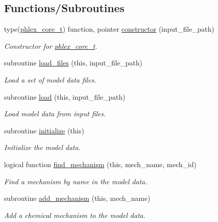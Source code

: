 \subsection*{Functions/\+Subroutines}
\begin{DoxyCompactItemize}
\item 
type(\mbox{\hyperlink{structpmc__phlex__core_1_1phlex__core__t}{phlex\+\_\+core\+\_\+t}}) function, pointer \mbox{\hyperlink{namespacepmc__phlex__core_a9bba3e699da52ecd3cde9d34d85321ef}{constructor}} (input\+\_\+file\+\_\+path)
\begin{DoxyCompactList}\small\item\em Constructor for \mbox{\hyperlink{structpmc__phlex__core_1_1phlex__core__t}{phlex\+\_\+core\+\_\+t}}. \end{DoxyCompactList}\item 
subroutine \mbox{\hyperlink{namespacepmc__phlex__core_a676921723e6f4d12eec0d0cff50fa538}{load\+\_\+files}} (this, input\+\_\+file\+\_\+path)
\begin{DoxyCompactList}\small\item\em Load a set of model data files. \end{DoxyCompactList}\item 
subroutine \mbox{\hyperlink{namespacepmc__phlex__core_a9194e33c7254eb3a5e55fe272f310682}{load}} (this, input\+\_\+file\+\_\+path)
\begin{DoxyCompactList}\small\item\em Load model data from input files. \end{DoxyCompactList}\item 
subroutine \mbox{\hyperlink{namespacepmc__phlex__core_afa7e6d2b65e64d9c60436e334bce6c0f}{initialize}} (this)
\begin{DoxyCompactList}\small\item\em Initialize the model data. \end{DoxyCompactList}\item 
logical function \mbox{\hyperlink{namespacepmc__phlex__core_a3791bdf03654e5cd3c7bd95a2942c885}{find\+\_\+mechanism}} (this, mech\+\_\+name, mech\+\_\+id)
\begin{DoxyCompactList}\small\item\em Find a mechanism by name in the model data. \end{DoxyCompactList}\item 
subroutine \mbox{\hyperlink{namespacepmc__phlex__core_aad9f8ac0f701442ce2b7ba8e403c8052}{add\+\_\+mechanism}} (this, mech\+\_\+name)
\begin{DoxyCompactList}\small\item\em Add a chemical mechanism to the model data. \end{DoxyCompactList}\item 

\end{DoxyCompactItemize}
